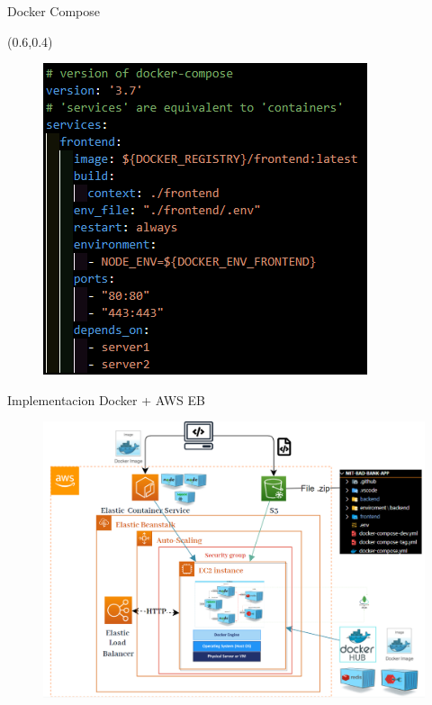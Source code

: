 \documentclass[xcolor=pdftex,dvipsnames,table]{beamer}
\begin{document}
\begin{frame}{Docker Compose}
    \begin{textblock*}{0.4\textwidth}(0.6\textwidth,0.4\textwidth)  
                    \begin{figure}
                        \centering
                        \includegraphics[width=0.9\linewidth]{implementacion/ejemplocompose.png}
                        \label{fig:my_label}
                    \end{figure}
    \end{textblock*}
\end{frame}
\begin{frame}{Implementacion Docker + AWS EB}
        \begin{figure}
            \centering
            \includegraphics[width=0.9\linewidth]{implementacion/dockermasaws.png}
            \label{fig:my_label}
        \end{figure}

\end{frame}
\end{document}
